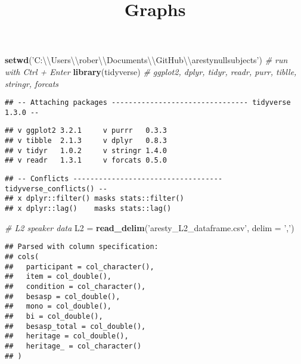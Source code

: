 \documentclass[
]{article}
\title{Graphs}
\author{}
\date{\vspace{-2.5em}}
\newenvironment{Shaded}{\begin{snugshade}}{\end{snugshade}}
\newcommand{\CharTok}[1]{\textcolor[rgb]{0.31,0.60,0.02}{#1}}
\newcommand{\CommentTok}[1]{\textcolor[rgb]{0.56,0.35,0.01}{\textit{#1}}}
\newcommand{\DataTypeTok}[1]{\textcolor[rgb]{0.13,0.29,0.53}{#1}}
\newcommand{\KeywordTok}[1]{\textcolor[rgb]{0.13,0.29,0.53}{\textbf{#1}}}
\newcommand{\NormalTok}[1]{#1}
\newcommand{\StringTok}[1]{\textcolor[rgb]{0.31,0.60,0.02}{#1}}
\begin{document}
\maketitle

\begin{Shaded}
\begin{Highlighting}[]
\KeywordTok{setwd}\NormalTok{(}\StringTok{'C:}\CharTok{\textbackslash{}\textbackslash{}}\StringTok{Users}\CharTok{\textbackslash{}\textbackslash{}}\StringTok{rober}\CharTok{\textbackslash{}\textbackslash{}}\StringTok{Documents}\CharTok{\textbackslash{}\textbackslash{}}\StringTok{GitHub}\CharTok{\textbackslash{}\textbackslash{}}\StringTok{arestynullsubjects'}\NormalTok{) }\CommentTok{# run with Ctrl + Enter}
\KeywordTok{library}\NormalTok{(tidyverse)  }\CommentTok{# ggplot2, dplyr, tidyr, readr, purr, tiblle, stringr, forcats}
\end{Highlighting}
\end{Shaded}

\begin{verbatim}
## -- Attaching packages -------------------------------- tidyverse 1.3.0 --
\end{verbatim}

\begin{verbatim}
## v ggplot2 3.2.1     v purrr   0.3.3
## v tibble  2.1.3     v dplyr   0.8.3
## v tidyr   1.0.2     v stringr 1.4.0
## v readr   1.3.1     v forcats 0.5.0
\end{verbatim}

\begin{verbatim}
## -- Conflicts ----------------------------------- tidyverse_conflicts() --
## x dplyr::filter() masks stats::filter()
## x dplyr::lag()    masks stats::lag()
\end{verbatim}

\begin{Shaded}
\begin{Highlighting}[]
\CommentTok{# L2 speaker data}
\NormalTok{L2 =}\StringTok{ }\KeywordTok{read_delim}\NormalTok{(}\StringTok{'aresty_L2_dataframe.csv'}\NormalTok{, }\DataTypeTok{delim =} \StringTok{','}\NormalTok{) }
\end{Highlighting}
\end{Shaded}

\begin{verbatim}
## Parsed with column specification:
## cols(
##   participant = col_character(),
##   item = col_double(),
##   condition = col_character(),
##   besasp = col_double(),
##   mono = col_double(),
##   bi = col_double(),
##   besasp_total = col_double(),
##   heritage = col_double(),
##   heritage_ = col_character()
## )
\end{verbatim}
\end{document}
